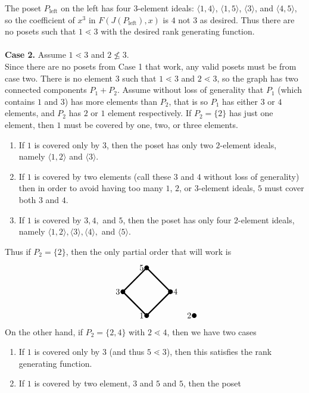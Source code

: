 \documentclass{article}
\newenvironment{solution}[1][Solution.]{\begin{trivlist}
\item[\hskip \labelsep {\bfseries #1}]}{\end{trivlist}}
\newcommand{\set}[1]{\{ #1 \}}
\newcommand{\ang}[1]{\langle #1 \rangle}
\begin{document}
\begin{solution}
  The poset $P_\text{left}$ on the left has four $3$-element ideals:
  $\ang{1,4}$, $\ang{1,5}$, $\ang 3$, and $\ang{4, 5}$,
  so the coefficient of $x^3$ in $F(J(P_\text{left}),x)$ is $4$ not $3$ as
  desired.
  Thus there are no posets such that $1 \lessdot 3$ with the desired
  rank generating function.
  \\~\\
  \textbf{Case 2.} Assume $1 \lessdot 3$ and $2 \not\leq 3$.\\
  Since there are no posets from Case 1 that work, any
  valid posets must be from case two.
  There is no element $3$ such that $1 \lessdot 3$ and $2 \lessdot 3$, so
  the graph has two connected components $P_1 + P_2$. Assume without loss of
  generality that $P_1$ (which contains $1$ and $3$) has more elements than
  $P_2$, that is so $P_1$ has either $3$ or $4$ elements, and $P_2$ has $2$ or
  $1$ element respectively.
  If $P_2 = \set 2$ has just one element, then $1$ must be covered by one, two, or three
  elements.
  \begin{enumerate}
    \item If $1$ is covered only by $3$, then the poset has only two $2$-element
    ideals, namely $\ang{1, 2}$ and $\ang 3$.
    \item  If $1$ is covered by two elements (call these $3$ and $4$ without loss of
    generality) then in order to avoid having too many $1$, $2$, or $3$-element
    ideals, $5$ must cover both $3$ and $4$.
    \item If $1$ is covered by $3, 4,$ and $5$, then the poset has only four $2$-element
    ideals, namely $\ang{1, 2}, \ang 3, \ang 4,$ and $\ang 5$.
  \end{enumerate}
  Thus if $P_2 = \set 2$, then the only partial order that will work is \[
    \begin{tikzpicture}
      \fill (0,0) circle (0.1) node[left] {1};
      \fill (2,0) circle (0.1) node[left] {2};
      \fill (-1,1) circle (0.1) node[left] {3};
      \fill (1,1) circle (0.1) node[right] {4};
      \fill (0,2) circle (0.1) node[left] {5};
      \draw[ultra thick] (0,0)--(-1,1)--(0,2)--(1,1)--cycle;
    \end{tikzpicture}
  \]
  On the other hand, if $P_2 = \set{2,4}$ with $2 \lessdot 4$, then we have two
  cases \begin{enumerate}
    \item If $1$ is covered only by $3$ (and thus $5 \lessdot 3$), then this satisfies the rank generating
    function.
    \item If $1$ is covered by two element, $3$ and $5$ and $5$, then the poset

\end{enumerate}
\end{solution}
\end{document}
